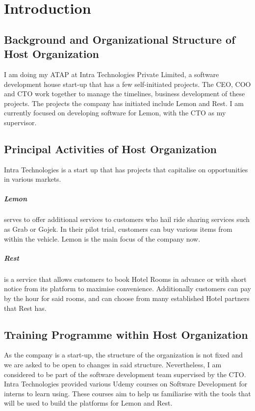 \section{Introduction}
\subsection{Background and Organizational Structure of Host Organization}
\noindent
I am doing my ATAP at Intra Technologies Private Limited, a software development house start-up that has a few self-initiated projects.
The CEO, COO and CTO work together to manage the timelines, business development of these projects.
The projects the company has initiated include Lemon and Rest. I am currently focused on developing software for Lemon, with the CTO as my supervisor. 

\subsection{Principal Activities of Host Organization}
\noindent
Intra Technologies is a start up that has projects that capitalise on opportunities in various markets.

\subparagraph{Lemon}
serves to offer additional services to customers who hail ride sharing services such as Grab or Gojek. In their
pilot trial, customers can buy various items from within the vehicle. Lemon is the main focus of the company now.

\subparagraph{Rest}
is a service that allows customers to book Hotel Rooms in advance or with short notice from its platform to 
maximise convenience. Additionally customers can pay by the hour for said rooms, and can choose from 
many established Hotel partners that Rest has.

\subsection{Training Programme within Host Organization}
\noindent
As the company is a start-up, the structure of the organization is not fixed and we are asked to be open to changes in said structure. 
Nevertheless, I am considered to be part of the software development team supervised by the CTO.
Intra Technologies provided various Udemy courses \cite{REF1:1} on Software Development for interns to learn using. These courses aim to help us familiarise with
the tools that will be used to build the platforms for Lemon and Rest.
